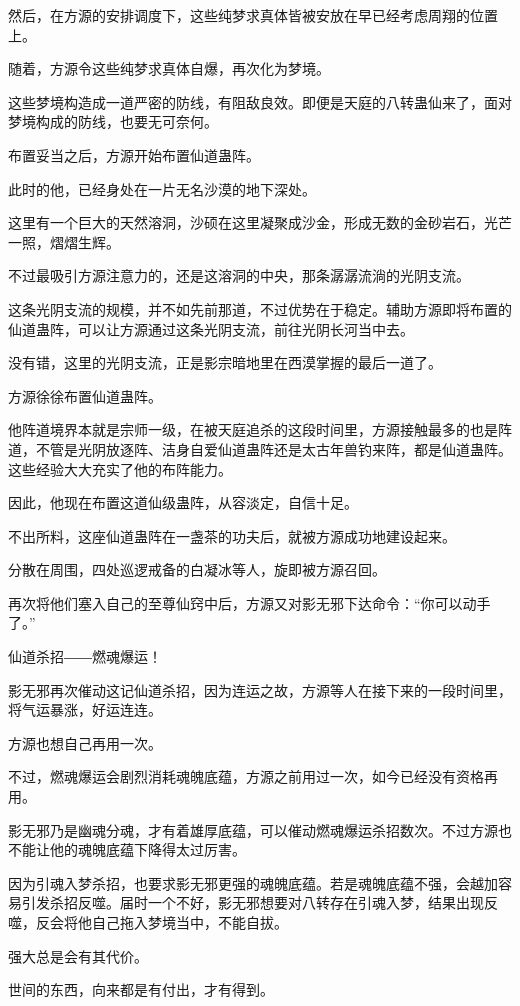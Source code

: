 \begin{this_body}
然后，在方源的安排调度下，这些纯梦求真体皆被安放在早已经考虑周翔的位置上。

随着，方源令这些纯梦求真体自爆，再次化为梦境。

这些梦境构造成一道严密的防线，有阻敌良效。即便是天庭的八转蛊仙来了，面对梦境构成的防线，也要无可奈何。

布置妥当之后，方源开始布置仙道蛊阵。

此时的他，已经身处在一片无名沙漠的地下深处。

这里有一个巨大的天然溶洞，沙硕在这里凝聚成沙金，形成无数的金砂岩石，光芒一照，熠熠生辉。

不过最吸引方源注意力的，还是这溶洞的中央，那条潺潺流淌的光阴支流。

这条光阴支流的规模，并不如先前那道，不过优势在于稳定。辅助方源即将布置的仙道蛊阵，可以让方源通过这条光阴支流，前往光阴长河当中去。

没有错，这里的光阴支流，正是影宗暗地里在西漠掌握的最后一道了。

方源徐徐布置仙道蛊阵。

他阵道境界本就是宗师一级，在被天庭追杀的这段时间里，方源接触最多的也是阵道，不管是光阴放逐阵、洁身自爱仙道蛊阵还是太古年兽钓来阵，都是仙道蛊阵。这些经验大大充实了他的布阵能力。

因此，他现在布置这道仙级蛊阵，从容淡定，自信十足。

不出所料，这座仙道蛊阵在一盏茶的功夫后，就被方源成功地建设起来。

分散在周围，四处巡逻戒备的白凝冰等人，旋即被方源召回。

再次将他们塞入自己的至尊仙窍中后，方源又对影无邪下达命令：“你可以动手了。”

仙道杀招――燃魂爆运！

影无邪再次催动这记仙道杀招，因为连运之故，方源等人在接下来的一段时间里，将气运暴涨，好运连连。

方源也想自己再用一次。

不过，燃魂爆运会剧烈消耗魂魄底蕴，方源之前用过一次，如今已经没有资格再用。

影无邪乃是幽魂分魂，才有着雄厚底蕴，可以催动燃魂爆运杀招数次。不过方源也不能让他的魂魄底蕴下降得太过厉害。

因为引魂入梦杀招，也要求影无邪更强的魂魄底蕴。若是魂魄底蕴不强，会越加容易引发杀招反噬。届时一个不好，影无邪想要对八转存在引魂入梦，结果出现反噬，反会将他自己拖入梦境当中，不能自拔。

强大总是会有其代价。

世间的东西，向来都是有付出，才有得到。


\end{this_body}
